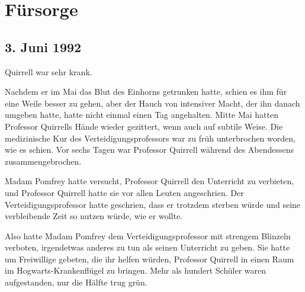\chapter{Fürsorge}

\section{3. Juni 1992}

 Quirrell war sehr krank.

\hplettrineextrapara
Nachdem er im Mai das Blut des Einhorns getrunken hatte, schien es ihm für eine Weile besser zu gehen, aber der Hauch von intensiver Macht, der ihn danach umgeben hatte, hatte nicht einmal einen Tag angehalten. Mitte Mai hatten Professor Quirrells Hände wieder gezittert, wenn auch auf subtile Weise. Die medizinische Kur des Verteidigungsprofessors war zu früh unterbrochen worden, wie es schien. Vor sechs Tagen war Professor Quirrell während des Abendessens zusammengebrochen.

Madam Pomfrey hatte versucht, Professor Quirrell den Unterricht zu verbieten, und Professor Quirrell hatte sie vor allen Leuten angeschrien. Der Verteidigungsprofessor hatte geschrien, dass er trotzdem sterben würde und seine verbleibende Zeit so nutzen würde, wie er wollte.

Also hatte Madam Pomfrey dem Verteidigungsprofessor mit strengem Blinzeln verboten, irgendetwas anderes zu tun als seinen Unterricht zu geben. Sie hatte um Freiwillige gebeten, die ihr helfen würden, Professor Quirrell in einen Raum im Hogwarts-Krankenflügel zu bringen. Mehr als hundert Schüler waren aufgestanden, nur die Hälfte trug grün.

